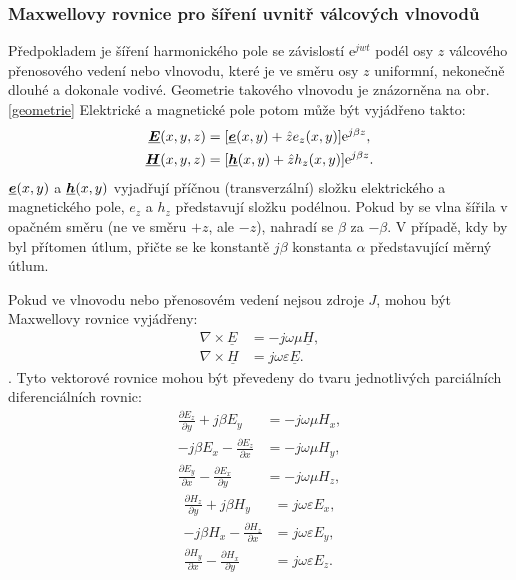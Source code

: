 \documentclass[12pt,a4paper,oneside]{article}
\numberwithin{equation}{section} %
\numberwithin{figure}{section} %
\numberwithin{table}{section} %
\newcommand{\me}{\mathrm{e}} %
\renewcommand{\vec}[1]{\mbox{\boldmath$#1$}} %
\newcommand{\faz}[1]{{\underline{#1}}} %
\begin{document}
\subsubsection{Maxwellovy rovnice pro šíření uvnitř válcových vlnovodů}
Předpokladem je šíření harmonického pole se závislostí $\me ^{jwt}$ podél osy $z$ válcového přenosového vedení nebo vlnovodu, které je ve směru osy $z$ uniformní, nekonečně dlouhé a dokonale vodivé. Geometrie takového vlnovodu je znázorněna na obr. \ref{geometrie} Elektrické a magnetické pole potom může být vyjádřeno takto:
\begin{subequations}
\label{hromadna}
\begin{align}
\faz{\vec{E}}(x, y, z)&=[\faz{\vec{e}}(x, y) + \hat{z}e_z(x, y)] \me ^{j\beta z} ,
\\
\faz{\vec{H}}(x, y, z)&=[\faz{\vec{h}}(x, y) + \hat{z}h_z(x, y)] \me ^{j\beta z} .
\end{align}
\end{subequations}
$\faz{\vec{e}}(x,y)$ a $\faz{\vec{h}}(x,y)$ vyjadřují příčnou (transverzální) složku elektrického a magnetického pole, $e_z$ a $h_z$ představují složku podélnou. Pokud by se vlna šířila v opačném směru (ne ve směru $+z$, ale $-z$), nahradí se $\beta$ za $-\beta$. V případě, kdy by byl přítomen útlum, přičte se ke konstantě $j \beta$ konstanta $\alpha$ představující měrný útlum.

Pokud ve vlnovodu nebo přenosovém vedení nejsou zdroje $J$, mohou být Maxwellovy rovnice vyjádřeny:
\begin{subequations}
\label{maxvektor2}
\begin{align}
\nabla \times \faz{E} &= -j\omega \mu \faz{H} ,
\\
\nabla \times \faz{H} &= j\omega \varepsilon \faz{E} .
\end{align}
\end{subequations}
.
Tyto vektorové rovnice mohou být převedeny do tvaru jednotlivých parciálních diferenciálních rovnic:
\begin{subequations}
\begin{align}
\frac{\partial E_z}{\partial y} + j \beta E_y &= -j \omega \mu H_x ,
\label{maxpart1}
\\
-j \beta E_x - \frac{\partial E_z}{\partial x} &= - j \omega \mu H_y ,
\\
\frac{\partial E_y}{\partial x} - \frac{\partial E_x}{\partial y} &= -j \omega \mu H_z ,
\end{align}
\end{subequations}
\begin{subequations}
\begin{align}
\frac{\partial H_z}{\partial y} + j \beta H_y &= j \omega \varepsilon E_x ,
\label{maxpart4}
\\
-j \beta H_x - \frac{\partial H_z}{\partial x} &= j \omega \varepsilon E_y ,
\label{maxpart5}
\\
\frac{\partial H_y}{\partial x} - \frac{\partial H_x}{\partial y} &= j \omega \varepsilon E_z .
\end{align}
\end{subequations}
\end{document}
